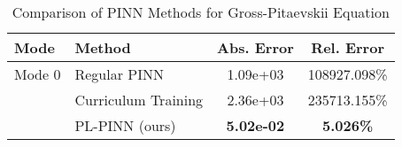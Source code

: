 \begin{table}[htbp]
\centering
\caption{Comparison of PINN Methods for Gross-Pitaevskii Equation}
\label{tab:pinn_comparison}
\begin{tabular}{llcc}
\toprule
Mode & Method & Abs. Error & Rel. Error \\
\midrule
Mode 0 & Regular PINN & 1.09e+03 & 108927.098\% \\
 & Curriculum Training & 2.36e+03 & 235713.155\% \\
 & PL-PINN (ours) & \textbf{5.02e-02} & \textbf{5.026\%} \\
\bottomrule
\end{tabular}
\end{table}